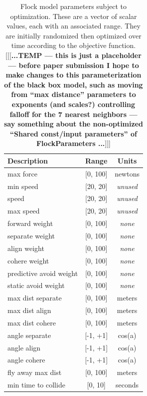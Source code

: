 \documentclass[letterpaper]{article}
\begin{document}
\begin{table}[b]
\centering
\begin{tabular}{ | l | c | c | }
    \hline
    \textbf{Description} & \textbf{Range} & \textbf{Units} \\
    \hline
    max force & [0, 100] & newtons \\
    min speed & [20, 20] & \textit{unused} \\
    speed & [20, 20] & \textit{unused} \\
    max speed & [20, 20] & \textit{unused} \\
    forward weight & [0, 100] & \textit{none} \\
    separate weight & [0, 100] & \textit{none} \\
    align weight & [0, 100] & \textit{none} \\
    cohere weight & [0, 100] & \textit{none} \\
    predictive avoid weight & [0, 100] & \textit{none} \\
    static avoid weight & [0, 100] & \textit{none} \\
    max dist separate & [0, 100] & meters \\
    max dist align & [0, 100] & meters \\
    max dist cohere & [0, 100] & meters \\
    angle separate & [-1, +1] & cos(a) \\
    angle align & [-1, +1] & cos(a) \\
    angle cohere & [-1, +1] & cos(a) \\
    fly away max dist & [0, 100] & meters \\
    min time to collide & [0, 10] & seconds \\
    \hline
\end{tabular}
\caption{Flock model parameters subject to optimization. These are a vector of scalar values, each with an associated range. They are initially randomized then optimized over time according to the objective function. [[[\textbf{...TEMP --- this is just a placeholder --- before paper submission I hope to make changes to this parameterization of the black box model, such as moving from ``max distance'' parameters to exponents (and scales?) controlling falloff for the 7 nearest neighbors --- say something about the non-optimized ``Shared const/input parameters'' of FlockParameters ...}]]] }
\label{table:flock-parameters}
\end{table}

\end{document}
